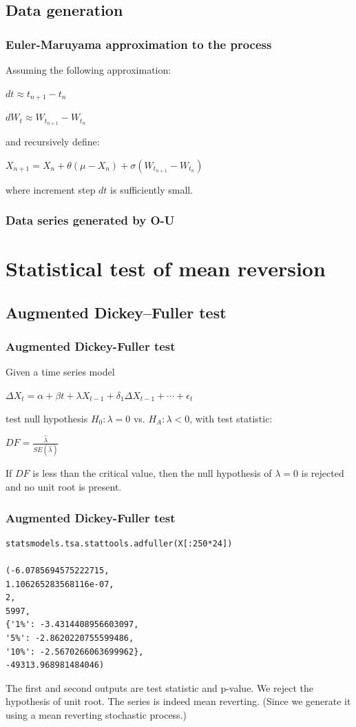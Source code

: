 \documentclass[11pt]{beamer}
\begin{document}
\subsection*{Data generation}
\begin{frame}
\frametitle{Euler-Maruyama approximation to the process}
Assuming the following approximation:
	\begin{center}
		$dt \approx  t_{n+1}-t_n$
		
		$dW_t \approx W_{t_{n+1}} - W_{t_{n}}$
	\end{center}
and recursively define:
	\begin{center}
	$X_{n+1}=X_n + \theta (\mu - X_n) +\sigma(W_{t_{n+1}} - W_{t_{n}})$
	\end{center}
	where increment step $dt$ is sufficiently small.
\end{frame}

\begin{frame}
\frametitle{Data series generated by O-U}
\noindent{}
\end{frame}

\section*{Statistical test of mean reversion}
\subsection*{Augmented Dickey--Fuller test}
\begin{frame}
\frametitle{Augmented Dickey-Fuller test}
Given a time series model
\begin{center}
$\Delta X_t=\alpha+\beta t +\lambda X_{t-1} +\delta_1\Delta X_{t-1} + \cdots +\epsilon_t$
\end{center}
test null hypothesis $H_0:\lambda=0$ vs. $H_A:\lambda<0$, with test statistic:
\begin{center}
	$DF=\frac{\hat{\lambda}}{SE(\hat{\lambda})}$
\end{center}
If $DF$ is less than the critical value, then the null hypothesis of $\lambda=0$ is rejected and no unit root is present.
\end{frame}

\begin{frame}[fragile]
\frametitle{Augmented Dickey-Fuller test}
\begin{verbatim}
statsmodels.tsa.stattools.adfuller(X[:250*24])

(-6.0785694575222715,
1.106265283568116e-07,
2,
5997,
{'1%': -3.4314408956603097,
'5%': -2.8620220755599486,
'10%': -2.5670266063699962},
-49313.968981484046)
\end{verbatim}
The first and second outputs are test statistic and p-value. We reject the hypothesis of unit root. The series is indeed mean reverting. (Since we generate it using a mean reverting stochastic process.)
\end{frame}
\end{document}

